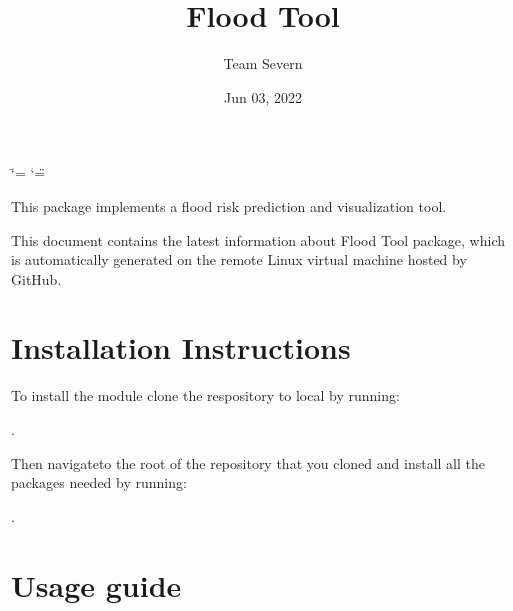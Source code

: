 \documentclass[letterpaper,10pt,english]{sphinxmanual}
\title{Flood Tool}
\date{Jun 03, 2022}
\author{Team Severn}
\begin{document}
\ifdefined\shorthandoff
  \ifnum\catcode`\=\string=\active\shorthandoff{=}\fi
  \ifnum\catcode`\"=\active{}\fi
\fi

\pagestyle{empty}
\sphinxmaketitle
\pagestyle{plain}
\sphinxtableofcontents
\pagestyle{normal}
\label{\detokenize{index::doc}}


\sphinxAtStartPar
This package implements a flood risk prediction and visualization tool.

\sphinxAtStartPar
This document contains the latest information about Flood Tool package, which is automatically generated on the remote Linux virtual machine hosted by GitHub.


\chapter{Installation Instructions}
\label{\detokenize{index:installation-instructions}}
\sphinxAtStartPar
To install the module  clone the respository to local by running:

\sphinxAtStartPar
{}.

\sphinxAtStartPar
Then navigateto the root of the repository that you cloned and install all the packages needed by
running:

\sphinxAtStartPar
{}

\sphinxAtStartPar
{}.


\chapter{Usage guide}
\label{\detokenize{index:usage-guide}}
\sphinxAtStartPar
{}
\end{document}
